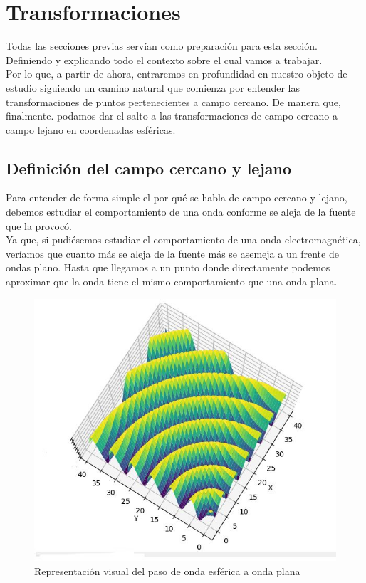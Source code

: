 \documentclass{article}
\begin{document}
\newpage
\section{Transformaciones}

Todas las secciones previas servían como preparación para esta sección. Definiendo y explicando todo el contexto sobre el cual vamos a trabajar.\\
Por lo que, a partir de ahora, entraremos en profundidad en nuestro objeto de estudio siguiendo un camino natural que comienza por entender las transformaciones de puntos pertenecientes a campo cercano. De manera que, finalmente. podamos dar el salto a las transformaciones de campo cercano a campo lejano en coordenadas esféricas.

\subsection{Definición del campo cercano y lejano}

Para entender de forma simple el por qué se habla de campo cercano y lejano, debemos estudiar el comportamiento de una onda conforme se aleja de la fuente que la provocó.\\
Ya que, si pudiésemos estudiar el comportamiento de una onda electromagnética, veríamos que cuanto más se aleja de la fuente más se asemeja a un frente de ondas plano. Hasta que llegamos a un punto donde directamente podemos aproximar que la onda tiene el mismo comportamiento que una onda plana.
\\

\begin{figure}[h]
    \centering
    \includegraphics[scale=0.4]{Figura7-Esquema para ejemplificar el paso de onda esferica a onda plana}
    \caption{Representación visual del paso de onda esférica a onda plana}
    \label{Ejemplo-paso-onda-esferica-a-onda-plana}
\end{figure}
\end{document}
